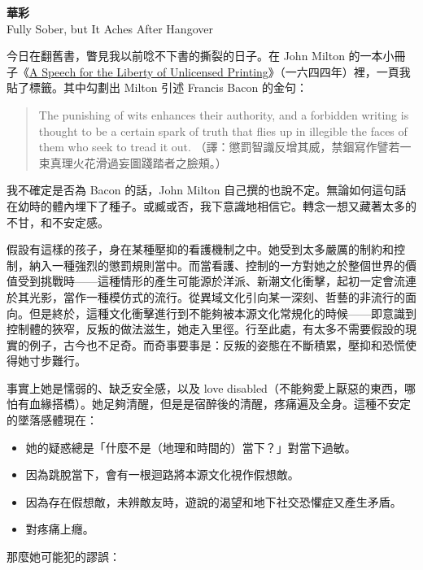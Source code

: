 \documentclass[10pt]{article}
\providecommand{\tightlist}{\setlength{\itemsep}{0pt}\setlength{\parskip}{0pt}}
\begin{document}
\begin{flushleft}
\textbf{華彩}\\
Fully Sober, but It Aches After Hangover\\
\end{flushleft}
\vspace{3em}

今日在翻舊書，瞥見我以前唸不下書的撕裂的日子。在 John Milton
的一本小冊子《\href{https://en.wikipedia.org/wiki/Areopagitica}{A Speech
for the Liberty of Unlicensed
Printing}》（一六四四年）裡，一頁我貼了標籤。其中勾劃出 Milton 引述
Francis Bacon 的金句：

\begin{quote}
The punishing of wits enhances their authority, and a forbidden writing
is thought to be a certain spark of truth that flies up in illegible the
faces of them who seek to tread it out.
（譯：懲罰智識反增其威，禁錮寫作譬若一束真理火花滑過妄圖踐踏者之臉頰。）
\end{quote}

我不確定是否為 Bacon 的話，John Milton
自己撰的也說不定。無論如何這句話在幼時的體內埋下了種子。或臧或否，我下意識地相信它。轉念一想又藏著太多的不甘，和不安定感。

假設有這樣的孩子，身在某種壓抑的看護機制之中。她受到太多嚴厲的制約和控制，納入一種強烈的懲罰規則當中。而當看護、控制的一方對她之於整個世界的價值受到挑戰時{——}這種情形的產生可能源於洋派、新潮文化衝擊，起初一定會流連於其光影，當作一種模仿式的流行。從異域文化引向某一深刻、哲藝的非流行的面向。但是終於，這種文化衝擊進行到不能夠被本源文化常規化的時候{——}即意識到控制體的狹窄，反叛的做法滋生，她走入里徑。行至此處，有太多不需要假設的現實的例子，古今也不足奇。而奇事要事是：反叛的姿態在不斷積累，壓抑和恐慌使得她寸步難行。

事實上她是懦弱的、缺乏安全感，以及 love
disabled（不能夠愛上厭惡的東西，哪怕有血緣搭橋）。她足夠清醒，但是是宿醉後的清醒，疼痛遍及全身。這種不安定的墜落感體現在：

\begin{itemize}
\tightlist
\item
  她的疑惑總是「什麼不是（地理和時間的）當下？」對當下過敏。
\item
  因為跳脫當下，會有一根迴路將本源文化視作假想敵。
\item
  因為存在假想敵，未辨敵友時，遊說的渴望和地下社交恐懼症又產生矛盾。
\item
  對疼痛上癮。
\end{itemize}

那麼她可能犯的謬誤：
\end{document}
